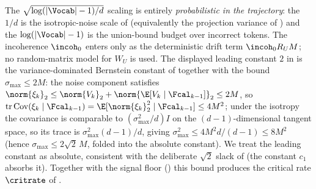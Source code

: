 \begin{remark}
\label{rem:incorrect_max_origin}
The $\sqrt{\log(|\Vocab|-1)/d}$ scaling is entirely \emph{probabilistic in
the trajectory}: the $1/d$ is the isotropic-noise scale of
 (equivalently the projection variance of
) and the $\log(|\Vocab|-1)$ is the union-bound
budget over incorrect tokens. The incoherence $\incoh_0$ enters only as
the deterministic drift term $\incoh_0 R_U M$; no random-matrix model for
$W_U$ is used. The displayed leading constant $2$ in
 is the variance-dominated Bernstein constant
of  together with the bound $\sigma_{\max}\le2M$: the noise
component satisfies $\norm{\xi_k}_2\le\norm{V_k}_2+\norm{\E[V_k\mid\Fcal_{k-1}]}_2\le2M$,
so $\operatorname{tr}\operatorname{Cov}(\xi_k\mid\Fcal_{k-1})=\E[\norm{\xi_k}_2^2\mid\Fcal_{k-1}]\le4M^2$;
under the isotropy  the covariance is comparable to
$(\sigma_{\max}^2/d)I$ on the $(d-1)$-dimensional tangent space, so its trace
is $\sigma_{\max}^2(d-1)/d$, giving $\sigma_{\max}^2\le4M^2 d/(d-1)\le8M^2$
(hence $\sigma_{\max}\le2\sqrt2\,M$, folded into the absolute constant). We
treat the leading constant as absolute, consistent with the deliberate
$\sqrt2$ slack of  (the constant $c_1$ absorbs it). Together with the signal floor
() this bound produces the critical rate
$\critrate$ of .
\end{remark}
